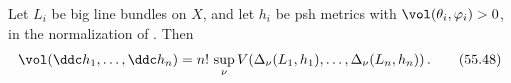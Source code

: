 \begin{theorem}\label{thm:ok-mvob-metrics}
Let \(L_i\) be big line bundles on \(X\), and let \(h_i\) be psh metrics
with \(\vol(\theta_i,\varphi_i)>0\), in the normalization of
.  Then
\[
 \vol(\ddc h_1,\dots,\ddc h_n)
 =n!\,\sup_\nu V\!\left(
    \Delta_\nu(L_1,h_1),\dots,\Delta_\nu(L_n,h_n)\right).
\tag{55.48}\label{eq:ok-mvob-metrics}
\]
\end{theorem}
